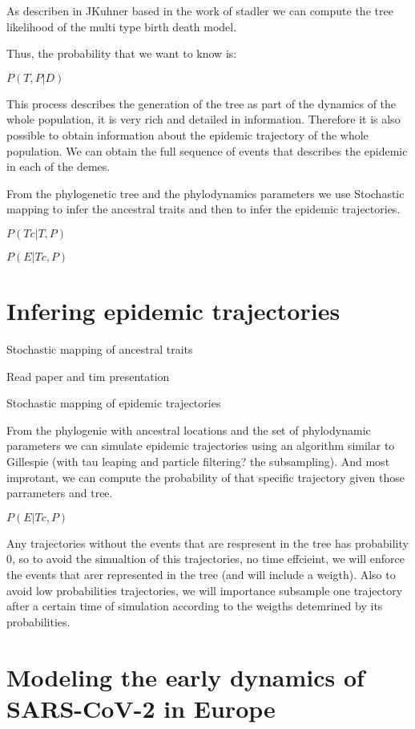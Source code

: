 As describen in JKuhner based in the work of stadler we can compute the tree likelihood of the multi type birth death model.

Thus, the probability that we want to know is:

$P(T, P | D)$

This process describes the generation of the tree as part of the dynamics of the whole population, it is very rich and detailed in information. Therefore it is also possible to obtain information about the epidemic trajectory of the whole population. We can obtain the full sequence of events that describes the epidemic in each of the demes.

From the phylogenetic tree and the phylodynamics parameters we use Stochastic mapping to infer the ancestral traits and then to infer the epidemic trajectories.

$P(Tc | T, P)$

$P(E | Tc, P)$


\section{Infering epidemic trajectories}

Stochastic mapping of ancestral traits

Read paper and tim presentation

Stochastic mapping of epidemic trajectories

From the phylogenie with ancestral locations and the set of phylodynamic parameters we can simulate epidemic trajectories using an algorithm similar to Gillespie (with tau leaping and particle filtering? the subsampling). And most improtant, we can compute the probability of that specific trajectory given those parrameters and tree. 

$P(E|Tc, P)$

Any trajectories without the events that are respresent in the tree has probability 0, so to avoid the simualtion of this trajectories, no time effcieint, we will enforce the events that arer represented in the tree (and will include a weigth). Also to avoid low probabilities trajectories, we will importance subsample one trajectory after a certain time of simulation according to the weigths detemrined by its probabilities. 


\section{Modeling the early dynamics of SARS-CoV-2 in Europe}

